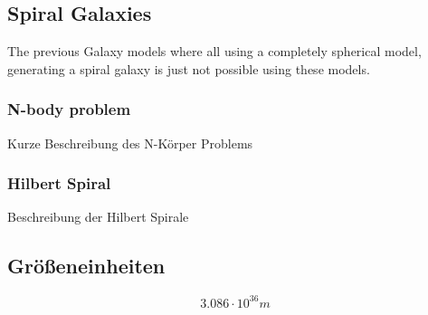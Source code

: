 \subsection{Spiral Galaxies}

The previous Galaxy models where all using a completely spherical model, generating
a spiral galaxy is just not possible using these models.

\subsubsection{N-body problem}

Kurze Beschreibung des N-Körper Problems

\subsubsection{Hilbert Spiral}

Beschreibung der Hilbert Spirale

\subsection{Größeneinheiten}

\begin{equation}
  3.086 \cdot 10^{36} m
\end{equation}
